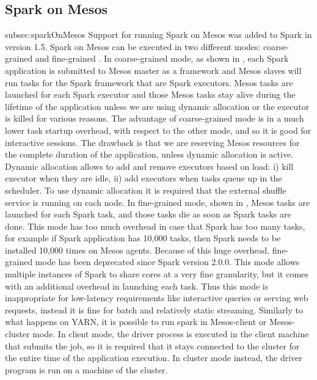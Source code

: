 \subsection{Spark on Mesos}{subsec:sparkOnMesos}
Support for running Spark on Mesos was added to Spark in version
1.5. Spark on Mesos can be executed in two different modes: coarse-grained
and fine-grained \cite{misc:SparkOnMesos}.
In coarse-grained mode, as shown in , 
each Spark application is submitted to Mesos master as a framework and Mesos
slaves will run tasks for the Spark framework that are Spark executors.
Mesos tasks are launched for each Spark executor and those
Mesos tasks stay alive during the lifetime of the application unless
we are using dynamic allocation or the executor is killed for various
reasons. The advantage of coarse-grained mode is in a much lower task
startup overhead, with respect to the other mode, and so it is good
for interactive sessions.
The drawback is that we are reserving Mesos resources for the complete
duration of the application, unless dynamic allocation is active.
Dynamic allocation allows to add and remove executors based on
load: i) kill executor when they are idle, ii) add executors when tasks
queue up in the scheduler. To use dynamic allocation it is required
that the external shuffle service is running on each node.
In fine-grained mode, shown in , 
Mesos tasks are launched for each Spark task, and those tasks die as soon as Spark tasks are done. This mode has too much overhead in case that Spark has too
many tasks, for example if Spark application has 10,000 tasks, then
Spark needs to be installed 10,000 times on Mesos agents. Because
of this huge overhead, fine-grained mode has been deprecated since
Spark version 2.0.0. This mode allows multiple instances of Spark to
share cores at a very fine granularity, but it comes with an additional
overhead in launching each task. Thus this mode is inappropriate
for low-latency requirements like interactive queries or serving web
requests, instead it is fine for batch and relatively static streaming.
Similarly to what happens on YARN, it is possible to run spark in
Mesos-client or Mesos-cluster mode. In client mode, the driver process
is executed in the client machine that submits the job, so it is required
that it stays connected to the cluster for the entire time of the application
execution. In cluster mode instead, the driver program is run on
a machine of the cluster.

